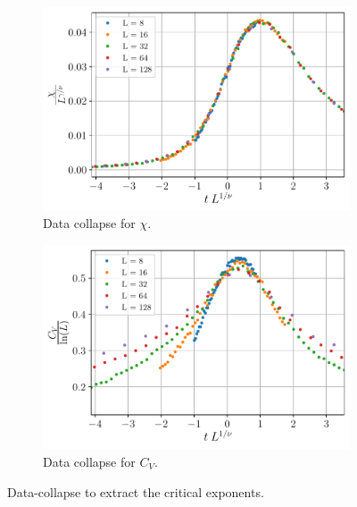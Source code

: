 \documentclass[../thesis_main.tex]{subfiles}
\begin{document}
\begin{figure}[!htb]\ContinuedFloat
    \centering
    \begin{subfigure}[b]{0.49\textwidth}
        \centering
        \includegraphics[width=\textwidth]{images/data collapse/chi data collapse.pdf}
        \caption{Data collapse for $\chi$.}
        \label{chi collapse}
    \end{subfigure}
    \begin{subfigure}[b]{0.49\textwidth}
        \centering
        \includegraphics[width=\textwidth]{images/data collapse/C_v data collapse.pdf}
        \caption{Data collapse for $C_V$.}
        \label{C_V collapse}
    \end{subfigure}
    \caption{Data-collapse to extract the critical exponents.}
    \label{datacollapse}
\end{figure}
\end{document}
